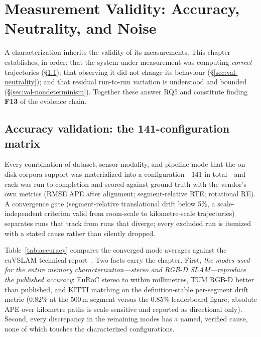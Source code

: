 \chapter{Measurement Validity: Accuracy, Neutrality, and Noise}
\label{ch:validity}

A characterization inherits the validity of its measurements. This chapter
establishes, in order: that the system under measurement was computing
\emph{correct} trajectories (\S\ref{sec:val-accuracy}); that observing it did
not change its behaviour (\S\ref{sec:val-neutrality}); and that residual
run-to-run variation is understood and bounded
(\S\ref{sec:val-nondeterminism}). Together these answer RQ5 and constitute
finding \textbf{F13} of the evidence chain.

\section{Accuracy validation: the 141-configuration matrix}
\label{sec:val-accuracy}

Every combination of dataset, sensor modality, and pipeline mode that the
on-disk corpora support was materialized into a configuration---141 in
total---and each was run to completion and scored against ground truth with
the vendor's own metrics (RMSE APE after alignment; segment-relative RTE;
rotational RE). A convergence gate (segment-relative translational drift
below 5\%, a scale-independent criterion valid from room-scale to
kilometre-scale trajectories) separates runs that track from runs that
diverge; every excluded run is itemized with a stated cause rather than
silently dropped.

Table~\ref{tab:accuracy} compares the converged mode averages against the
cuVSLAM technical report~\cite{cuvslam2025}. Two facts carry the chapter.
First, \emph{the modes used for the entire memory characterization---stereo
and RGB-D SLAM---reproduce the published accuracy}: EuRoC stereo to within
millimetres, TUM RGB-D better than published, and KITTI matching on the
definition-stable per-segment drift metric (0.82\% at the 500\,m segment
versus the 0.85\% leaderboard figure; absolute APE over kilometre paths is
scale-sensitive and reported as directional only). Second, every
discrepancy in the remaining modes has a named, verified cause, none of
which touches the characterized configurations.

